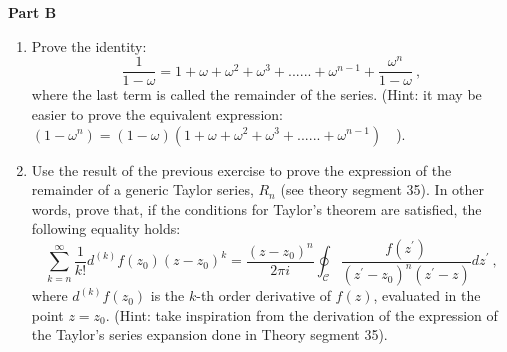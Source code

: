 \documentclass[fleqn]{article}
\begin{document}
  \pagebreak

  \textbf{Part B}
  \begin{enumerate}
    \item Prove the identity:
    $$\frac{1}{1-\omega} = 1 + \omega +\omega^2 + \omega^3 + ...... + \omega^{n-1}  + \frac{\omega^n}{1- \omega}~,$$
    where the last term is called the remainder of the series. (Hint: it may be easier to prove the equivalent expression: $(1- \omega^n) =(1- \omega)( 1 + \omega +\omega^2 + \omega^3 + ...... + \omega^{n-1} )$~~).

    \item  Use the result of the previous exercise to prove the expression of the remainder of a generic Taylor series, $R_n$ (see theory segment 35).  In other words, prove that, if the conditions for Taylor's theorem are satisfied, the following equality holds: 
    $$\sum^{\infty}_{k=n} \frac{1}{k!} d^{(k)} f(z_0) (z-z_0)^k = \frac{(z-z_0)^n}{2 \pi i} \oint_{\mathcal C}  \frac{f(z^\prime)}{(z^\prime - z_0)^n(z^\prime - z)} dz^\prime ~,$$
    where $d^{(k)} f(z_0)$ is the $k$-th order derivative of $f(z)$, evaluated in the point $z=z_0$.   (Hint: take inspiration from the derivation of the expression of the Taylor's series expansion done in Theory segment 35). 
    
  \end{enumerate}
\end{document}
